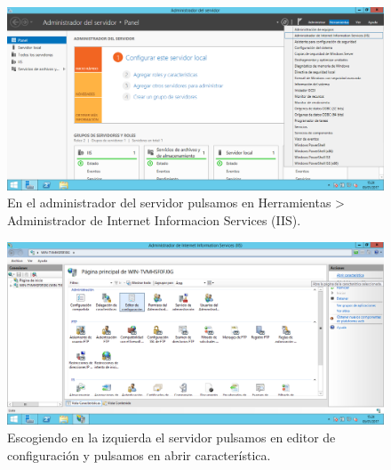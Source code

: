 \begin{figure}[H]
	\centering
	\includegraphics[scale=0.4]{iis1.png}
	\caption{En el administrador del servidor pulsamos en Herramientas > \space Administrador de Internet Informacion Services (IIS).}
\end{figure}

\begin{figure}[H]
	\centering
	\includegraphics[scale=0.4]{iis2.png}
	\caption{Escogiendo en la izquierda el servidor pulsamos en editor de configuración y pulsamos en abrir característica.}
\end{figure}

